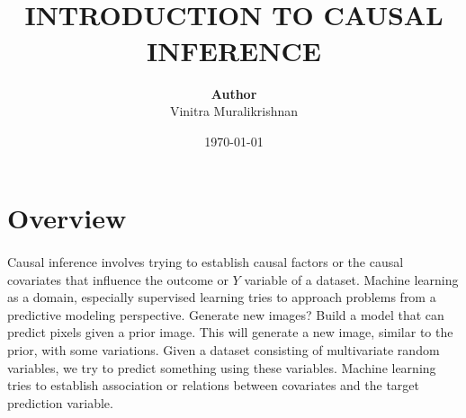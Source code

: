 \documentclass{article}
\begin{document}
\title{ \normalsize \textsc{}
		\\ [2.0cm]
		\LARGE \textbf{\uppercase{Introduction to Causal Inference}
        }
		}
\date{\today}

\author{\textbf{Author} \\ 
		Vinitra Muralikrishnan}

{\let\newpage\relax\maketitle}
\tableofcontents
\newpage

\section{Overview}
\paragraph{}{Causal inference involves trying to establish causal factors or the causal covariates that influence the outcome or $Y$
variable of a dataset. Machine learning as a domain, especially supervised learning tries to approach problems from a predictive
modeling perspective. Generate new images? Build a model that can predict pixels given a prior image. This will generate a new image,
similar to the prior, with some variations. Given a dataset consisting of multivariate random variables, we try to predict something
using these variables. Machine learning tries to establish association or relations between covariates and the target prediction variable.}
\end{document}

